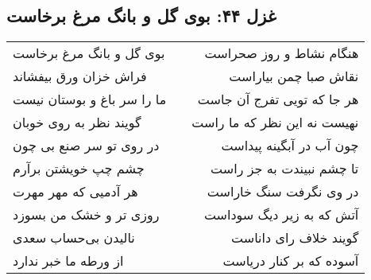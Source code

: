 \begin{center}
\section*{غزل ۴۴: بوی گل و بانگ مرغ برخاست}
\label{sec:044}
\begin{longtable}{l p{0.5cm} r}
بوی گل و بانگ مرغ برخاست
&&
هنگام نشاط و روز صحراست
\\
فراش خزان ورق بیفشاند
&&
نقاش صبا چمن بیاراست
\\
ما را سر باغ و بوستان نیست
&&
هر جا که تویی تفرج آن جاست
\\
گویند نظر به روی خوبان
&&
نهیست نه این نظر که ما راست
\\
در روی تو سر صنع بی چون
&&
چون آب در آبگینه پیداست
\\
چشم چپ خویشتن برآرم
&&
تا چشم نبیندت به جز راست
\\
هر آدمیی که مهر مهرت
&&
در وی نگرفت سنگ خاراست
\\
روزی تر و خشک من بسوزد
&&
آتش که به زیر دیگ سوداست
\\
نالیدن بی‌حساب سعدی
&&
گویند خلاف رای داناست
\\
از ورطه ما خبر ندارد
&&
آسوده که بر کنار دریاست
\\
\end{longtable}
\end{center}
